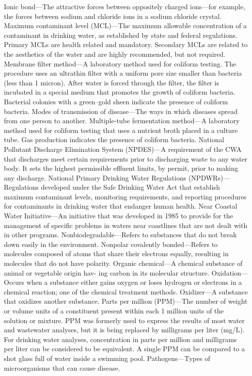 \documentclass{article}
\begin{document}
Ionic bond---The attractive forces between oppositely charged ions---for
example, the forces between sodium and chloride ions in a sodium
chloride crystal. Maximum contaminant level (MCL)---The maximum
allowable concentration of a contaminant in drinking water, as
established by state and federal regulations. Primary MCLs are health
related and mandatory. Secondary MCLs are related to the aesthetics of
the water and are highly recommended, but not required. Membrane filter
method---A laboratory method used for coliform testing. The procedure
uses an ultrathin filter with a uniform pore size smaller than bacteria
(less than 1 micron). After water is forced through the filter, the
filter is incubated in a special medium that promotes the growth of
coliform bacteria. Bacterial colonies with a green--gold sheen indicate
the presence of coliform bacteria. Modes of transmission of
disease---The ways in which diseases spread from one person to another.
Multiple-tube fermentation method---A laboratory method used for
coliform testing that uses a nutrient broth placed in a culture tube.
Gas production indicates the presence of coliform bacteria. National
Pollutant Discharge Elimination System (NPDES)---A requirement of the
CWA that discharges meet certain requirements prior to discharging waste
to any water body. It sets the highest permissible effluent limits, by
permit, prior to making any discharge. National Primary Drinking Water
Regulations (NPDWRs)---Regulations developed under the Safe Drinking
Water Act that establish maximum contaminant levels, monitoring
requirements, and reporting procedures for contaminants in drinking
water that endanger human health. Near Coastal Water Initiative---An
initiative that was developed in 1985 to provide for the management of
specific problems in waters near coastlines that are not dealt with in
other programs. Nonbiodegradable---Refers to substances that do not
break down easily in the environment. Nonpolar covalently
bonded---Refers to molecules composed of atoms that share their
electrons equally, resulting in molecules that do not have polarity.
Organic chemical---A chemical substance of animal or vegetable origin
hav- ing carbon in its molecular structure. Oxidation---Occurs when a
substance either gains oxygen or loses hydrogen or electrons in a
chemical reaction; one of the chemical treatment methods. Oxidizer---A
substance that oxidizes another substance. Parts per million (PPM)---The
number of weight or volume units of a constituent present within each 1
million units of the solution or mixture. PPM was formerly used to
express the results of most water and wastewater analyses, but it is
being replaced by milligrams per liter (mg/L). For drinking water
analyses, concentration in parts per million and milligrams per liter
can be considered to be equivalent. A single PPM can be compared to a
shot glass full of water inside a swimming pool. Pathogens---Types of
microorganisms that can cause disease.
\end{document}
